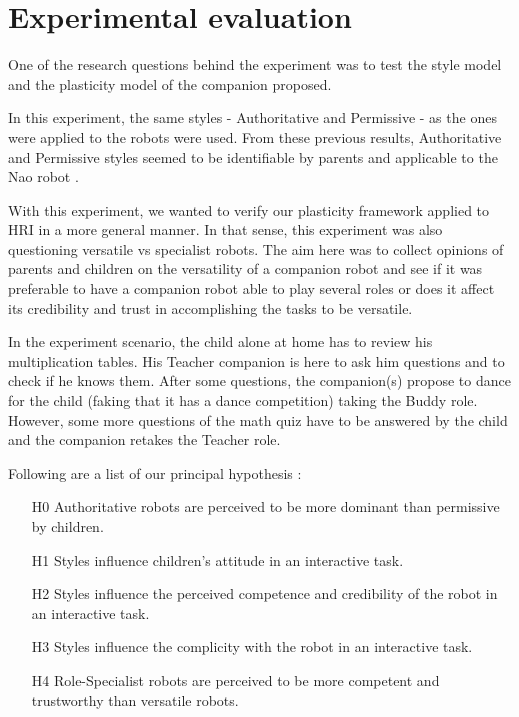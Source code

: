 \section{Experimental evaluation}
\label{sec:research-questions-and-scenario}
One of the research questions behind the experiment was to test the style model and the plasticity model of the companion proposed. 

In this experiment, the same styles - Authoritative and Permissive -  as the ones were applied to the robots were used.
From these previous results, Authoritative and Permissive styles seemed to be identifiable by parents and applicable to the Nao robot \cite{Johal2014}. 

With this experiment, we wanted to verify our plasticity framework applied to HRI in a more general manner. 
In that sense, this experiment was also questioning versatile vs specialist robots. 
The aim here was to collect opinions of parents and children on the versatility of a companion robot and see if it was preferable to have a companion robot able to play several roles or does it affect its credibility and trust in accomplishing the tasks to be versatile.

In the experiment scenario, the child alone at home has to review his multiplication tables. 
His Teacher companion is here to ask him questions and to check if he knows them. 
After some questions, the companion(s) propose to dance for the child (faking that it has a dance competition) taking the Buddy role. 
However, some more questions of the math quiz have to be answered by the child and the companion retakes the Teacher role.


Following are a list of our principal hypothesis :
\begin{itemize}[noitemsep,nolistsep]
	\item[H0] Authoritative robots are perceived to be more dominant than permissive by children.
	\item[H1] Styles influence children's attitude in an interactive task.
	\item[H2] Styles influence the perceived competence and credibility of the robot in an interactive task.
	\item[H3] Styles influence the complicity with the robot in an interactive task.
	\item[H4] Role-Specialist robots are perceived to be more competent and trustworthy than versatile robots.
\end{itemize}
